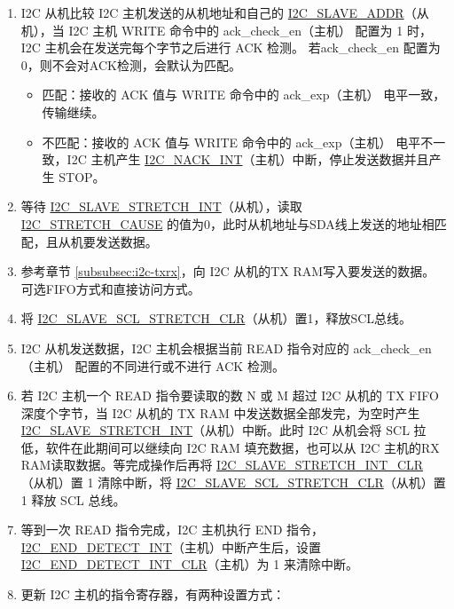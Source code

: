 \documentclass[main\_\_CN.tex]{subfiles}
\begin{document}
\begin{enumerate}
\item I2C 从机比较 I2C 主机发送的从机地址和自己的 \hyperref[fielddesc:I2CSLAVEADDR]{I2C\_SLAVE\_ADDR}（从机），当 I2C 主机 WRITE 命令中的 ack\_check\_en（主机） 配置为 1 时，I2C 主机会在发送完每个字节之后进行 ACK 检测。 若ack\_check\_en 配置为 0，则不会对ACK检测，会默认为匹配。
\begin{itemize}
\item 匹配：接收的 ACK 值与 WRITE 命令中的 ack\_exp（主机） 电平一致，传输继续。
\item 不匹配：接收的 ACK 值与 WRITE 命令中的 ack\_exp（主机） 电平不一致，I2C 主机产生 \hyperref[int:i2c-nack]{I2C\_NACK\_INT}（主机）中断，停止发送数据并且产生 STOP。
\end{itemize}

\item 等待 \hyperref[int:i2c-slave-stretch]{I2C\_SLAVE\_STRETCH\_INT}（从机），读取 \hyperref[fielddesc:I2CSTRETCHCAUSE]{I2C\_STRETCH\_CAUSE} 的值为0，此时从机地址与SDA线上发送的地址相匹配，且从机要发送数据。

\item 参考章节 \ref{subsubsec:i2c-txrx}，向 I2C 从机的TX RAM写入要发送的数据。可选FIFO方式和直接访问方式。
\item 将 \hyperref[fielddesc:I2CSLAVESCLSTRETCHCLR]{I2C\_SLAVE\_SCL\_STRETCH\_CLR}（从机）置1，释放SCL总线。

\item I2C 从机发送数据，I2C 主机会根据当前 READ 指令对应的 ack\_check\_en（主机） 配置的不同进行或不进行 ACK 检测。
\item 若 I2C 主机一个 READ 指令要读取的数 N 或 M 超过 I2C 从机的 TX FIFO 深度个字节，当 I2C 从机的 TX RAM 中发送数据全部发完，为空时产生 \hyperref[int:i2c-slave-stretch]{I2C\_SLAVE\_STRETCH\_INT}（从机）中断。此时 I2C 从机会将 SCL 拉低，软件在此期间可以继续向 I2C RAM 填充数据，也可以从 I2C 主机的RX RAM读取数据。等完成操作后再将 \hyperref[fielddesc:I2CSLAVESTRETCHINTCLR]{I2C\_SLAVE\_STRETCH\_INT\_CLR}（从机）置 1 清除中断，将 \hyperref[fielddesc:I2CSLAVESCLSTRETCHCLR]{I2C\_SLAVE\_SCL\_STRETCH\_CLR}（从机）置 1 释放 SCL 总线。

\item 等到一次 READ 指令完成，I2C 主机执行 END 指令，\hyperref[int:i2c-end]{I2C\_END\_DETECT\_INT}（主机）中断产生后，设置 \hyperref[fielddesc:I2CENDDETECTINTCLR]{I2C\_END\_DETECT\_INT\_CLR}（主机）为 1 来清除中断。

\newpage
\item 更新 I2C 主机的指令寄存器，有两种设置方式：


\end{enumerate}
\end{document}
